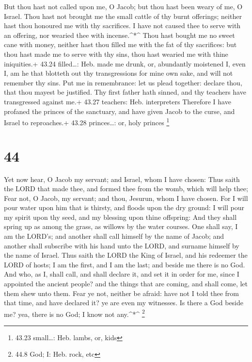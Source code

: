  But thou hast not called upon me, O Jacob; but thou hast
been weary of me, O Israel.  Thou hast not brought me the
small cattle of thy burnt offerings; neither hast thou honoured me with
thy sacrifices. I have not caused thee to serve with an offering, nor
wearied thee with incense.\^{}*\^{}  Thou hast bought me no
sweet cane with money, neither hast thou filled me with the fat of thy
sacrifices: but thou hast made me to serve with thy sins, thou hast
wearied me with thine iniquities.+ 43.24 filled\ldots: Heb. made me
drunk, or, abundantly moistened  I, even I, am he that
blotteth out thy transgressions for mine own sake, and will not remember
thy sins.  Put me in remembrance: let us plead together:
declare thou, that thou mayest be justified.  Thy first
father hath sinned, and thy teachers have transgressed against me.+
43.27 teachers: Heb. interpreters  Therefore I have
profaned the princes of the sanctuary, and have given Jacob to the
curse, and Israel to reproaches.+ 43.28 princes\ldots: or, holy princes
\footnote{43.23 small\ldots: Heb. lambs, or, kids}

\hypertarget{section-43}{%
\section{44}\label{section-43}}

 Yet now hear, O Jacob my servant; and Israel, whom I have
chosen:  Thus saith the LORD that made thee, and formed thee
from the womb, which will help thee; Fear not, O Jacob, my servant; and
thou, Jesurun, whom I have chosen.  For I will pour water
upon him that is thirsty, and floods upon the dry ground: I will pour my
spirit upon thy seed, and my blessing upon thine offspring: 
And they shall spring up as among the grass, as willows by the water
courses.  One shall say, I am the LORD's; and another shall
call himself by the name of Jacob; and another shall subscribe with his
hand unto the LORD, and surname himself by the name of Israel.
 Thus saith the LORD the King of Israel, and his redeemer
the LORD of hosts; I am the first, and I am the last; and beside me
there is no God.  And who, as I, shall call, and shall
declare it, and set it in order for me, since I appointed the ancient
people? and the things that are coming, and shall come, let them shew
unto them.  Fear ye not, neither be afraid: have not I told
thee from that time, and have declared it? ye are even my witnesses. Is
there a God beside me? yea, there is no God; I know not any.\^{}*\^{}
\footnote{44.8 God; I: Heb. rock, etc}

